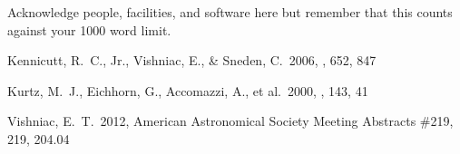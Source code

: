 \documentclass[RNAAS]{aastex62}
\begin{document}

\acknowledgments

Acknowledge people, facilities, and software here but remember that this counts
against your 1000 word limit.

\begin{thebibliography}{}

 Kennicutt, R.~C., Jr., Vishniac, E., \& Sneden, C.\ 2006, \apj, 652, 847 

 Kurtz, M.~J., Eichhorn, G., Accomazzi, A., et al.\ 2000, \aaps, 143, 41 

 Vishniac, E.~T.\ 2012, American Astronomical Society Meeting Abstracts \#219, 219, 204.04 

\end{thebibliography}
\end{document}
